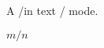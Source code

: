 \documentclass{article}
\begin{document}
A \slash in text \slash{} mode.

$m \slash n$
\end{document}
